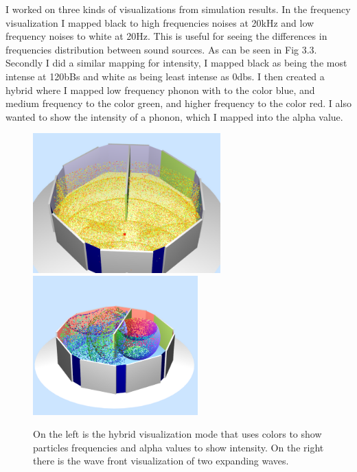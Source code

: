\documentclass{thesis}
\begin{document}
I worked on three kinds of visualizations from simulation results. In the frequency visualization I mapped black to high frequencies noises at 20kHz and low frequency noises to white at 20Hz. This is useful for seeing the differences in frequencies distribution between sound sources. As can be seen in Fig 3.3. Secondly I did a similar mapping for intensity, I mapped black as being the most intense at 120bBs and white as being least intense as 0dbs. I then created a hybrid where I mapped low frequency phonon with to the color blue, and medium frequency to the color green, and higher frequency to the color red. I also wanted to show the intensity of a phonon, which I mapped into the alpha value. 
\begin{figure}
        \centering
        \includegraphics[width=2.845in]{images/hybridVis_show}
        \includegraphics[width=2.5in]{images/wave_show}
        \caption{On the left is the hybrid visualization mode that uses colors to show particles frequencies and alpha values to show intensity. On the right there is the wave front visualization of two expanding waves.}
    \end{figure}
\end{document}
